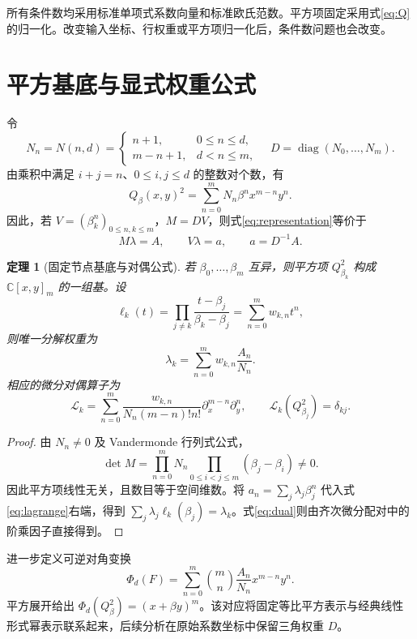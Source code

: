 \documentclass[UTF8,a4paper,zihao=-4,fontset=windows]{ctexart}
\theoremstyle{chinese}
\newtheorem{theorem}{定理}[section]
\numberwithin{equation}{section}
\newcommand{\C}{\mathbb C}
\newcommand{\diag}{\operatorname{diag}}
\begin{document}
所有条件数均采用标准单项式系数向量和标准欧氏范数。平方项固定采用式\eqref{eq:Q}的归一化。改变输入坐标、行权重或平方项归一化后，条件数问题也会改变。

\section{平方基底与显式权重公式}
令
\begin{equation}\label{eq:N}
N_n=N(n,d)=\begin{cases}n+1,&0\le n\le d,\\m-n+1,&d<n\le m,\end{cases}
\quad D=\diag(N_0,\ldots,N_m).
\end{equation}
由乘积中满足 $i+j=n$、$0\le i,j\le d$ 的整数对个数，有
\begin{equation}\label{eq:square}
Q_\beta(x,y)^2=\sum_{n=0}^{m}N_n\beta^n x^{m-n}y^n.
\end{equation}
因此，若 $V=(\beta_k^n)_{0\le n,k\le m}$，$M=DV$，则式\eqref{eq:representation}等价于
\begin{equation}\label{eq:system}
M\lambda=A,\qquad V\lambda=a,\qquad a=D^{-1}A.
\end{equation}

\begin{theorem}[固定节点基底与对偶公式]\label{thm:basis}
若 $\beta_0,\ldots,\beta_m$ 互异，则平方项 $Q_{\beta_k}^2$ 构成 $\C[x,y]_m$ 的一组基。设
\[
\ell_k(t)=\prod_{j\ne k}\frac{t-\beta_j}{\beta_k-\beta_j}
=\sum_{n=0}^{m}w_{k,n}t^n,
\]
则唯一分解权重为
\begin{equation}\label{eq:lagrange}
\lambda_k=\sum_{n=0}^{m}w_{k,n}\frac{A_n}{N_n}.
\end{equation}
相应的微分对偶算子为
\begin{equation}\label{eq:dual}
\mathcal L_k=\sum_{n=0}^{m}\frac{w_{k,n}}{N_n(m-n)!n!}
\partial_x^{m-n}\partial_y^n,
\qquad \mathcal L_k(Q_{\beta_j}^2)=\delta_{kj}.
\end{equation}
\end{theorem}
\begin{proof}
由 $N_n\ne0$ 及 Vandermonde 行列式公式，
\[
\det M=\prod_{n=0}^{m}N_n\prod_{0\le i<j\le m}(\beta_j-\beta_i)\ne0.
\]
因此平方项线性无关，且数目等于空间维数。将 $a_n=\sum_j\lambda_j\beta_j^n$ 代入式\eqref{eq:lagrange}右端，得到 $\sum_j\lambda_j\ell_k(\beta_j)=\lambda_k$。式\eqref{eq:dual}则由齐次微分配对中的阶乘因子直接得到。
\end{proof}

进一步定义可逆对角变换
\begin{equation}\label{eq:Phi}
\Phi_d(F)=\sum_{n=0}^{m}\binom{m}{n}\frac{A_n}{N_n}x^{m-n}y^n.
\end{equation}
平方展开给出 $\Phi_d(Q_\beta^2)=(x+\beta y)^m$。该对应将固定等比平方表示与经典线性形式幂表示联系起来，后续分析在原始系数坐标中保留三角权重 $D$。
\end{document}
